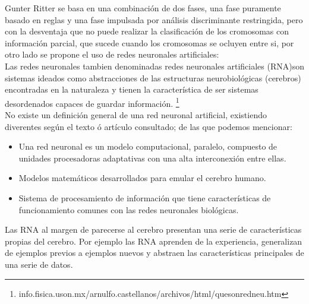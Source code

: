 \documentclass[12pt,letterpaper,titlepage]{article}
\begin{document}
\begin{itemize}
Gunter Ritter \cite{133} se basa en una combinación de dos fases, una fase puramente basado en reglas y una fase impulsada por análisis discriminante restringida, pero con la desventaja que no puede realizar la clasificación de los cromosomas con información parcial, que sucede cuando los cromosomas se ocluyen entre si, por otro lado se propone el uso de redes neuronales artificiales:\\

Las redes neuronales tambien denominadas redes neuronales artificiales (RNA)son sistemas ideados como abstracciones de las estructuras neurobiológicas (cerebros) encontradas en la naturaleza y tienen la característica de ser sistemas desordenados capaces de guardar información.
 \footnote{info.fisica.uson.mx/arnulfo.castellanos/archivos/html/quesonredneu.htm}\\

No existe un definición general de una red neuronal artificial, existiendo diverentes según el texto ó artículo consultado; de las que podemos mencionar:

\begin{itemize}\itemsep=0pt
\item Una red neuronal es un modelo computacional, paralelo, compuesto de unidades procesadoras adaptativas con una alta interconexión entre ellas.  \cite{126}\\
\item Modelos matemáticos desarrollados para emular el cerebro humano. \cite{127}\\
\item Sistema de procesamiento de información que tiene características de funcionamiento comunes con las redes neuronales biológicas. \cite{128}\\
\end{itemize}


Las RNA al margen de parecerse al cerebro presentan una serie de características
propias del cerebro. Por ejemplo las RNA aprenden de la experiencia, generalizan de
ejemplos previos a ejemplos nuevos y abstraen las características principales de una
serie de datos. \cite{124}


\end{itemize}
\end{document}
